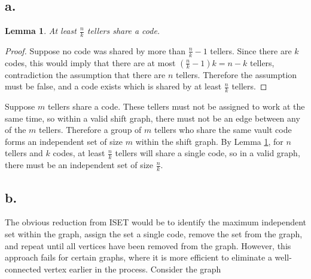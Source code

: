 \documentclass[11pt]{article}
\newtheorem{lem}{Lemma}
\begin{document}
\section{}
\subsection*{a.}
\begin{lem} 
    \label{thm:min-same}  
    At least $\frac{n}{k}$ tellers share a code.

\end{lem}
\begin{proof}
    Suppose no code was shared by more than $\frac{n}{k} - 1$ tellers. Since there are $k$ codes, this would imply that there are at most $(\frac{n}{k} - 1)k = n - k$ tellers, contradiction the assumption that there are $n$ tellers. Therefore the assumption must be false, and a code exists which is shared by at least $\frac{n}{k}$ tellers.
\end{proof}

Suppose $m$ tellers share a code. These tellers must not be assigned to work at the same time, so within a valid shift graph, there must not be an edge between any of the $m$ tellers. Therefore a group of $m$ tellers who share the same vault code forms an independent set of size $m$ within the shift graph. By Lemma \ref{thm:min-same}, for $n$ tellers and $k$ codes, at least $\frac{n}{k}$ tellers will share a single code, so in a valid graph, there must be an independent set of size $\frac{n}{k}$.

\subsection*{b.}
The obvious reduction from ISET would be to identify the maximum independent set within the graph, assign the set a single code, remove the set from the graph, and repeat until all vertices have been removed from the graph. 
 However, this approach fails for certain graphs, where it is more efficient to eliminate a well-connected vertex earlier in the process. Consider the graph 
 \begin{figure}[H]
    \centering
 \end{figure}
\end{document}
